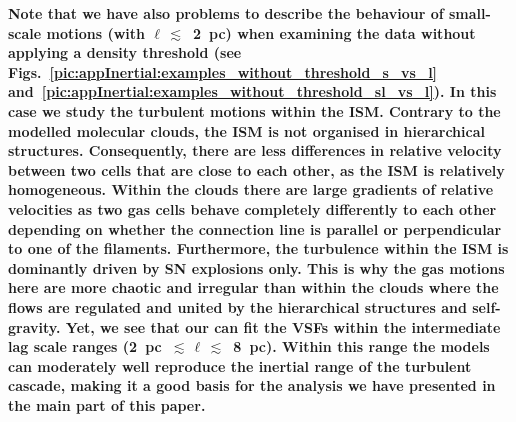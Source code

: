 \textbf{
	Note that we have also problems to describe the behaviour of small-scale motions (with $\ell\,\lesssim$~2~pc) when examining the data without applying a density threshold (see Figs.~\ref{pic:appInertial:examples_without_threshold_s_vs_l} and~\ref{pic:appInertial:examples_without_threshold_sl_vs_l}).
	In this case we study the turbulent motions within the ISM. 
	Contrary to the modelled molecular clouds, the ISM is not organised in hierarchical structures.
	Consequently, there are less differences in relative velocity between two cells that are close to each other, as the ISM is relatively homogeneous. 
	Within the clouds there are large gradients of relative velocities as two gas cells behave completely differently to each other depending on whether the connection line is parallel or perpendicular to one of the filaments.
	Furthermore, the turbulence within the ISM is dominantly driven by SN explosions only.
	This is why the gas motions here are more chaotic and irregular than within the clouds where the flows are regulated and united by the hierarchical structures and self-gravity.
	Yet, we see that our can fit the VSFs within the intermediate lag scale ranges (2~pc~$\lesssim\,\ell\,\lesssim$~8~pc). 
	Within this range the models can moderately well reproduce the inertial range of the turbulent cascade, making it a good basis for the analysis we have presented in the main part of this paper.
}











